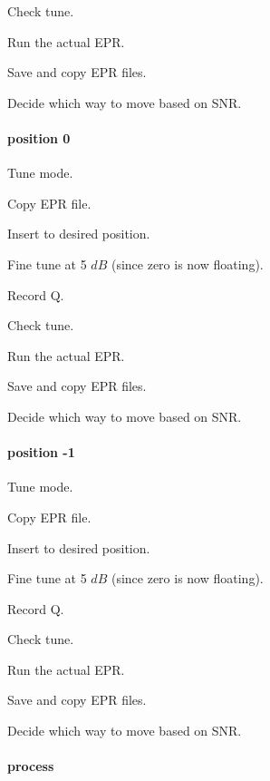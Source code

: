 {Check tune.


Run the actual EPR.

Save and copy EPR files.

Decide which way to move based on SNR.

\paragraph{position 0}
Tune mode.

Copy EPR file.

Insert to desired position.

Fine tune at 5 $dB$ (since zero is now floating).

Record Q.

Check tune.


Run the actual EPR.

Save and copy EPR files.

Decide which way to move based on SNR.

\paragraph{position -1}
Tune mode.

Copy EPR file.

Insert to desired position.

Fine tune at 5 $dB$ (since zero is now floating).

Record Q.

Check tune.


Run the actual EPR.

Save and copy EPR files.

Decide which way to move based on SNR.

\paragraph{process}

}

